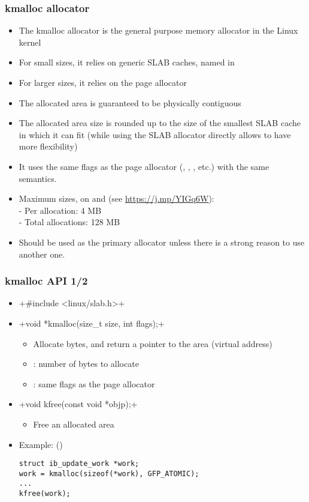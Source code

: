 \begin{frame}
  \frametitle{kmalloc allocator}
  \begin{itemize}
  \item The kmalloc allocator is the general purpose memory allocator
    in the Linux kernel
  \item For small sizes, it relies on generic SLAB caches, named
     in 
  \item For larger sizes, it relies on the page allocator
  \item The allocated area is guaranteed to be physically contiguous
  \item The allocated area size is rounded up to the size of the
        smallest SLAB cache in which it can fit
        (while using the SLAB allocator directly allows to have more
        flexibility)
  \item It uses the same flags as the page allocator (,
    , , etc.) with the same semantics.
  \item Maximum sizes, on  and  (see
    \url{https://j.mp/YIGq6W}): \\
    - Per allocation: 4 MB \\
    - Total allocations: 128 MB
  \item Should be used as the primary allocator unless there is a
    strong reason to use another one.
  \end{itemize}
\end{frame}

\begin{frame}[fragile]
  \frametitle{kmalloc API 1/2}
  \begin{itemize}
  \item {}+#include <linux/slab.h>+
  \item {}+void *kmalloc(size_t size, int flags);+
    \begin{itemize}
    \item Allocate  bytes, and return a pointer to the area
      (virtual address)
    \item {}: number of bytes to allocate
    \item {}: same flags as the page allocator
    \end{itemize}
  \item {}+void kfree(const void *objp);+
    \begin{itemize}
    \item Free an allocated area
    \end{itemize}
  \item Example: ()
\begin{verbatim}
struct ib_update_work *work;
work = kmalloc(sizeof(*work), GFP_ATOMIC);
...
kfree(work);
\end{verbatim}
  \end{itemize}
\end{frame}

